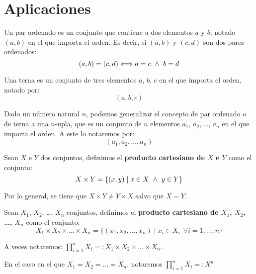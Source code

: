 \section{Aplicaciones}

\begin{definicion}
    Un par ordenado es un conjunto que contiene a dos elementos $a$ y $b$, notado $(a,b)$ en el que importa el orden. Es decir, si $(a,b)$ y $(c,d)$ son dos pares ordenados:
    $$(a,b) = (c,d) \Longleftrightarrow a = c \ \land \  b = d$$
\end{definicion}

\begin{definicion}[Terna]
    Una terna es un conjunto de tres elementos $a$, $b$, $c$ en el que importa el orden, notado por:
    \begin{equation*}
        (a,b,c)
    \end{equation*}
\end{definicion}

\begin{definicion}[$n$-Upla]
    Dado un número natural $n$, podemos generalizar el concepto de par ordenado o de terna a una $n$-upla, que es un conjunto de $n$ elementos $a_1$, $a_2$, \ldots, $a_n$ en el que importa el orden. A este lo notaremos por:
    \begin{equation*}
        (a_1,a_2,\ldots,a_n)
    \end{equation*}
\end{definicion}

\begin{definicion}
    Sean $X$ e $Y$ dos conjuntos, definimos el \textbf{producto cartesiano de $X$ e $Y$} como el conjunto:
    $$X\times Y = \{(x,y) \mid x \in X \ \land \  y \in Y\}$$
\end{definicion}

Por lo general, se tiene que $X \times Y \neq Y \times X$ salvo que $X = Y$.

\begin{definicion}
    Sean $X_1$, $X_2$, \ldots, $X_n$ conjuntos, definimos el \textbf{producto cartesiano de $X_1$, $X_2$,
        \ldots, $X_n$} como el conjunto:
    $$X_1 \times X_2 \times \ldots \times X_n = \{(x_1, x_2, \ldots, x_n) \mid x_i \in X_i ~~\forall i=1,\ldots,n \}$$
\end{definicion}
\begin{notacion}
    A veces notaremos: $\displaystyle \prod\limits_{i=1}^n X_i =: X_1 \times X_2 \times \ldots \times X_n $.

    En el caso en el que $X_1 = X_2 = \ldots = X_n$, notaremos $\displaystyle \prod\limits_{i=1}^n X_i =: X^n$.
\end{notacion}

